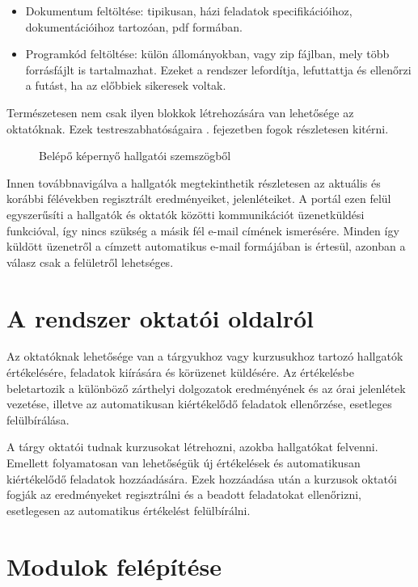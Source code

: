     \begin{itemize}
        \item Dokumentum feltöltése: tipikusan, házi feladatok specifikációihoz, dokumentációihoz tartozóan, pdf formában.
        \item Programkód feltöltése: külön állományokban, vagy zip fájlban, mely több forrásfájlt is tartalmazhat. Ezeket a rendszer lefordítja, lefuttattja és ellenőrzi a futást, ha az előbbiek sikeresek voltak.
    \end{itemize}

    Természetesen nem csak ilyen blokkok létrehozására van lehetősége az oktatóknak. Ezek testreszabhatóságaira . fejezetben fogok részletesen kitérni.
    
    \begin{figure}[h]
        \centering
        \caption{Belépő képernyő hallgatói szemszögből}
        \label{fig:jporta_home}
    \end{figure}

    Innen továbbnavigálva a hallgatók megtekinthetik részletesen az aktuális és korábbi félévekben regisztrált eredményeiket, jelenléteiket. A portál ezen felül egyszerűsíti a hallgatók és oktatók közötti kommunikációt üzenetküldési funkcióval, így nincs szükség a másik fél e-mail címének ismerésére. Minden így küldött üzenetről a címzett automatikus e-mail formájában is értesül, azonban a válasz csak a felületről lehetséges.
 
\section{A rendszer oktatói oldalról}\label{section:teacher}
    Az oktatóknak lehetősége van a tárgyukhoz vagy kurzusukhoz tartozó hallgatók értékelésére, feladatok kiírására és körüzenet küldésére. Az értékelésbe beletartozik a különböző zárthelyi dolgozatok eredményének és az órai jelenlétek vezetése, illetve az automatikusan kiértékelődő feladatok ellenőrzése, esetleges felülbírálása.

    A tárgy oktatói tudnak kurzusokat létrehozni, azokba hallgatókat felvenni. Emellett folyamatosan van lehetőségük új értékelések és automatikusan kiértékelődő feladatok hozzáadására. Ezek hozzáadása után a kurzusok oktatói fogják az eredményeket regisztrálni és a beadott feladatokat ellenőrizni, esetlegesen az automatikus értékelést felülbírálni.

\section{Modulok felépítése}